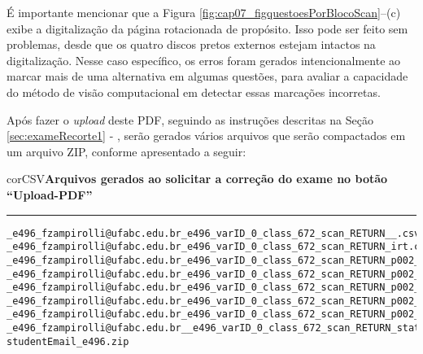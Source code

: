 É importante mencionar que a Figura \ref{fig:cap07_figquestoesPorBlocoScan}--(c) exibe a digitalização da página rotacionada de propósito. Isso pode ser feito sem problemas, desde que os quatro discos pretos externos estejam intactos na digitalização. Nesse caso específico, os erros foram gerados intencionalmente ao marcar mais de uma alternativa em algumas questões, para avaliar a capacidade do método de visão computacional em detectar essas marcações incorretas. 


Após fazer o \textit{upload} deste PDF, seguindo as instruções descritas na Seção \ref{sec:exameRecorte1} - , serão gerados vários arquivos que serão compactados em um arquivo ZIP, conforme apresentado a seguir:

\begin{myboxCode}{corCSV}{\textbf{Arquivos gerados ao solicitar a correção do exame no botão ``Upload-PDF''}}\vspace{3mm}
\hrule
\begin{verbatim}
_e496_fzampirolli@ufabc.edu.br_e496_varID_0_class_672_scan_RETURN__.csv
_e496_fzampirolli@ufabc.edu.br_e496_varID_0_class_672_scan_RETURN_irt.csv
_e496_fzampirolli@ufabc.edu.br_e496_varID_0_class_672_scan_RETURN_p002_s3_q002.png
_e496_fzampirolli@ufabc.edu.br_e496_varID_0_class_672_scan_RETURN_p002_s3_q003.png
_e496_fzampirolli@ufabc.edu.br_e496_varID_0_class_672_scan_RETURN_p002_s3_q004.png
_e496_fzampirolli@ufabc.edu.br_e496_varID_0_class_672_scan_RETURN_p002_s3_q005.png
_e496_fzampirolli@ufabc.edu.br_e496_varID_0_class_672_scan_RETURN_p002_s4_q001_D_OK.png
_e496_fzampirolli@ufabc.edu.br__e496_varID_0_class_672_scan_RETURN_statistics.csv
studentEmail_e496.zip
\end{verbatim}
\end{myboxCode}

